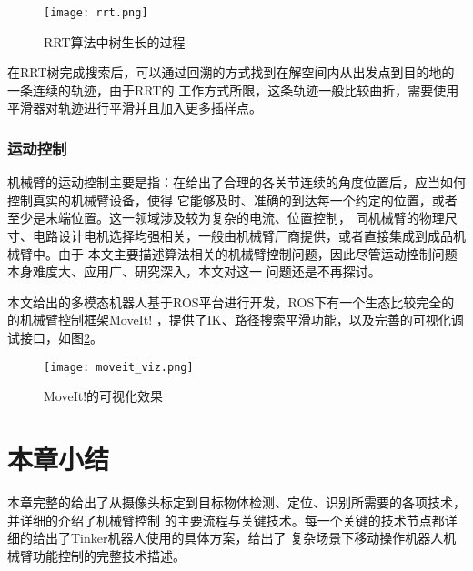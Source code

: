 \begin{figure}[ht] %
  \centering
  \texttt{[image: rrt.png]}
  \caption{RRT算法中树生长的过程\cite{kuffner2000rrt}}
  \label{fig:rrt}
\end{figure}

在RRT树完成搜索后，可以通过回溯的方式找到在解空间内从出发点到目的地的一条连续的轨迹，由于RRT的
工作方式所限，这条轨迹一般比较曲折，需要使用平滑器对轨迹进行平滑并且加入更多插样点。

\subsubsection{运动控制}

机械臂的运动控制主要是指：在给出了合理的各关节连续的角度位置后，应当如何控制真实的机械臂设备，使得
它能够及时、准确的到达每一个约定的位置，或者至少是末端位置。这一领域涉及较为复杂的电流、位置控制，
同机械臂的物理尺寸、电路设计电机选择均强相关，一般由机械臂厂商提供，或者直接集成到成品机械臂中。由于
本文主要描述算法相关的机械臂控制问题，因此尽管运动控制问题本身难度大、应用广、研究深入，本文对这一
问题还是不再探讨。


本文给出的多模态机器人基于ROS平台进行开发，ROS下有一个生态比较完全的的机械臂控制框架MoveIt!\citep{chitta2012moveit}
，提供了IK、路径搜索平滑功能，以及完善的可视化调试接口，如图\ref{fig:moveit_viz}。

\begin{figure}[ht] %
  \centering
  \texttt{[image: moveit\_viz.png]}
  \caption{MoveIt!的可视化效果}
  \label{fig:moveit_viz}
\end{figure}


\section{本章小结}

本章完整的给出了从摄像头标定到目标物体检测、定位、识别所需要的各项技术，并详细的介绍了机械臂控制
的主要流程与关键技术。每一个关键的技术节点都详细的给出了Tinker机器人使用的具体方案，给出了
复杂场景下移动操作机器人机械臂功能控制的完整技术描述。






















